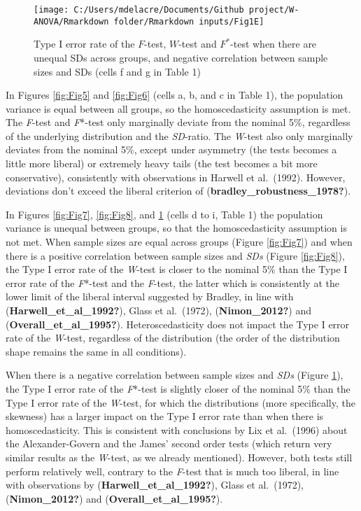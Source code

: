 \documentclass[
  english,
  man]{apa6}
\begin{document}
\newpage
\begin{landscape}

\begin{figure}

{\centering \texttt{[image: C:/Users/mdelacre/Documents/Github project/W-ANOVA/Rmarkdown folder/Rmarkdown inputs/Fig1E]} 

}

\caption{Type I error rate of the $F$-test, $W$-test and $F^*$-test when there are unequal SDs across groups, and negative correlation between sample sizes and SDs (cells f and g in Table 1)}\label{fig:Fig9}
\end{figure}

\end{landscape}
\newpage

In Figures \ref{fig:Fig5} and \ref{fig:Fig6} (cells a, b, and c in Table 1), the population variance is equal between all groups, so the homoscedasticity assumption is met. The \emph{F}-test and \emph{F}*-test only marginally deviate from the nominal 5\%, regardless of the underlying distribution and the \emph{SD}-ratio. The \emph{W}-test also only marginally deviates from the nominal 5\%, except under asymmetry (the tests becomes a little more liberal) or extremely heavy tails (the test becomes a bit more conservative), consistently with observations in Harwell et al.~(1992). However, deviations don't exceed the liberal criterion of (\textbf{bradley\_robustness\_1978?}).

In Figures \ref{fig:Fig7}, \ref{fig:Fig8}, and \ref{fig:Fig9} (cells d to i, Table 1) the population variance is unequal between groups, so that the homoscedasticity assumption is not met. When sample sizes are equal across groups (Figure \ref{fig:Fig7}) and when there is a positive correlation between sample sizes and \emph{SDs} (Figure \ref{fig:Fig8}), the Type I error rate of the \emph{W}-test is closer to the nominal 5\% than the Type I error rate of the \emph{F}*-test and the \emph{F}-test, the latter which is consistently at the lower limit of the liberal interval suggested by Bradley, in line with (\textbf{Harwell\_et\_al\_1992?}), Glass et al.~(1972), (\textbf{Nimon\_2012?}) and (\textbf{Overall\_et\_al\_1995?}). Heteroscedasticity does not impact the Type I error rate of the \emph{W}-test, regardless of the distribution (the order of the distribution shape remains the same in all conditions).

When there is a negative correlation between sample sizes and \emph{SDs} (Figure \ref{fig:Fig9}), the Type I error rate of the \emph{F}*-test is slightly closer of the nominal 5\% than the Type I error rate of the \emph{W}-test, for which the distributions (more specifically, the skewness) has a larger impact on the Type I error rate than when there is homoscedasticity. This is consistent with conclusions by Lix et al.~(1996) about the Alexander-Govern and the James' second order tests (which return very similar results as the \emph{W}-test, as we already mentioned). However, both tests still perform relatively well, contrary to the \emph{F}-test that is much too liberal, in line with observations by (\textbf{Harwell\_et\_al\_1992?}), Glass et al.~(1972), (\textbf{Nimon\_2012?}) and (\textbf{Overall\_et\_al\_1995?}).
\end{document}
